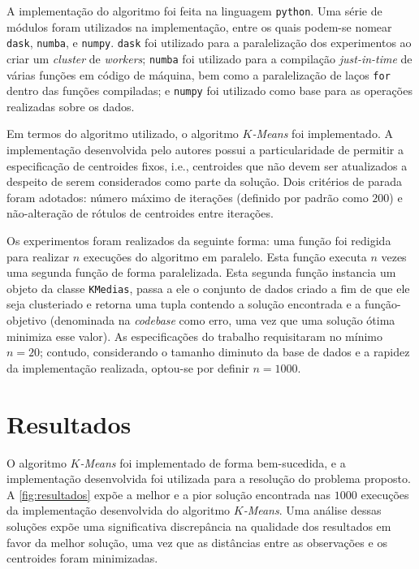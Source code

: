 \documentclass[12pt]{article}
\begin{document}
A implementação do algoritmo foi feita na linguagem \texttt{python}. Uma série de módulos foram utilizados na implementação, entre os quais podem-se nomear \texttt{dask}, \texttt{numba}, e \texttt{numpy}. \texttt{dask} foi utilizado para a paralelização dos experimentos ao criar um \textit{cluster} de \textit{workers}; \texttt{numba} foi utilizado para a compilação \textit{just-in-time} de várias funções em código de máquina, bem como a paralelização de laços \texttt{for} dentro das funções compiladas; e \texttt{numpy} foi utilizado como base para as operações realizadas sobre os dados.

Em termos do algoritmo utilizado, o algoritmo \textit{$K$-Means} foi implementado. A implementação desenvolvida pelo autores possui a particularidade de permitir a especificação de centroides fixos, i.e., centroides que não devem ser atualizados a despeito de serem considerados como parte da solução. Dois critérios de parada foram adotados: número máximo de iterações (definido por padrão como $200$) e não-alteração de rótulos de centroides entre iterações.

Os experimentos foram realizados da seguinte forma: uma função foi redigida para realizar $n$ execuções do algoritmo em paralelo. Esta função executa $n$ vezes uma segunda função de forma paralelizada. Esta segunda função instancia um objeto da classe \texttt{KMedias}, passa a ele o conjunto de dados criado a fim de que ele seja clusteriado e retorna uma tupla contendo a solução encontrada e a função-objetivo (denominada na \textit{codebase} como erro, uma vez que uma solução ótima minimiza esse valor). As especificações do trabalho requisitaram no mínimo $n = 20$; contudo, considerando o tamanho diminuto da base de dados e a rapidez da implementação realizada, optou-se por definir $n = 1000$.



\section{Resultados}   %
\label{sec:resultados} %



O algoritmo \textit{$K$-Means} foi implementado de forma bem-sucedida, e a implementação desenvolvida foi utilizada para a resolução do problema proposto. A \autoref{fig:resultados} expõe a melhor e a pior solução encontrada nas $1000$ execuções da implementação desenvolvida do algoritmo \textit{$K$-Means}. Uma análise dessas soluções expõe uma significativa discrepância na qualidade dos resultados em favor da melhor solução, uma vez que as distâncias entre as observações e os centroides foram minimizadas.
\end{document}

